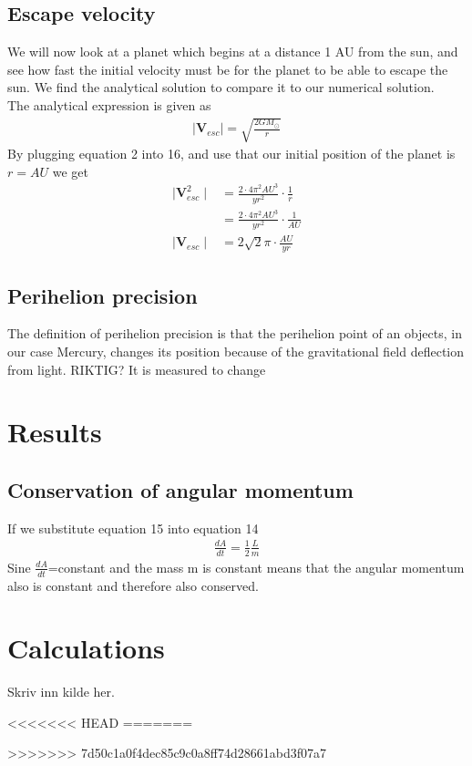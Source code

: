 \documentclass{article}
\begin{document}
\begin{multicols}{2}
\subsection{Escape velocity}
We will now look at a planet which begins at a distance 1 AU from the sun, 
and see how fast the initial velocity must be for the planet to be able to escape the sun. We find the analytical solution to compare it to our numerical solution. \\
The analytical expression is given as 
\begin{align}
    \mid{\mathbf{V}_{esc}}\mid=\sqrt{\frac{2GM_{\odot}}{r}}
\end{align}
By plugging equation 2 into 16, and use that our initial position of the planet is $r=AU$ we get
\begin{align}
\mid{\mathbf{V}_{esc}^2}\mid&=\frac{2\cdot 4\pi^2AU^3}{yr^2}\cdot\frac{1}{r}\\
&=\frac{2\cdot 4\pi^2AU^3}{yr^2}\cdot\frac{1}{AU}\\
\mid{\mathbf{V}_{esc}}\mid&=2\sqrt{2}\pi\cdot\frac{AU}{yr}
\end{align}
\subsection{Perihelion precision}
The definition of perihelion precision is that the perihelion point of an objects, in our case Mercury, changes its position because of 
the gravitational field deflection from light. RIKTIG? It is measured to change   
\section{Results}
\subsection{Conservation of angular momentum}
If we substitute equation 15 into equation 14 
\begin{align}
    \frac{dA}{dt}=\frac{1}{2}\frac{L}{m}
\end{align}
Sine $\frac{dA}{dt}$=constant and the mass m is constant means that the angular momentum also is constant and therefore also conserved.  
\end{multicols}



\clearpage
\appendix %
\section{Calculations} 

\begin{thebibliography}{9}
	Skriv inn kilde her.
\end{thebibliography}
<<<<<<< HEAD
=======

>>>>>>> 7d50c1a0f4dec85c9c0a8ff74d28661abd3f07a7
\end{document}
